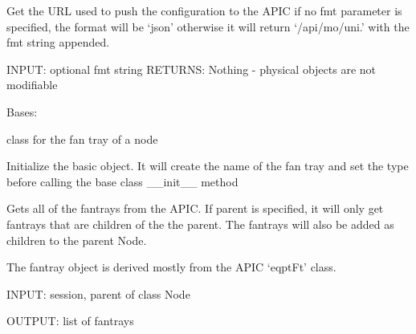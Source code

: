\documentclass[letterpaper,10pt,english]{sphinxmanual}
\begin{document}
\begin{fulllineitems}
\begin{fulllineitems}
\end{fulllineitems}


\begin{fulllineitems}
\label{aciphysobject:aciphysobject.BaseACIPhysObject.get_url}
Get the URL used to push the configuration to the APIC
if no fmt parameter is specified, the format will be `json'
otherwise it will return `/api/mo/uni.' with the fmt string appended.

INPUT: optional fmt string
RETURNS: Nothing - physical objects are not modifiable

\end{fulllineitems}


\end{fulllineitems}


\begin{fulllineitems}
\label{aciphysobject:aciphysobject.Fantray}
Bases: {\hyperref[aciphysobject:aciphysobject.BaseACIPhysModule]{}}

class for the fan tray of a node

Initialize the basic object.  It will create the name of the fan tray and set the type
before calling the base class \_\_init\_\_ method

\begin{fulllineitems}
\label{aciphysobject:aciphysobject.Fantray.get}
Gets all of the fantrays from the APIC.  If parent is specified, it will only get fantrays that are
children of the the parent.  The fantrays will also be added as children to the parent Node.

The fantray object is derived mostly from the APIC `eqptFt' class.

INPUT: session, parent of class Node

OUTPUT: list of fantrays

\end{fulllineitems}


\begin{fulllineitems}
\label{aciphysobject:aciphysobject.Fantray.populate_children}
\end{fulllineitems}


\end{fulllineitems}
\end{document}
